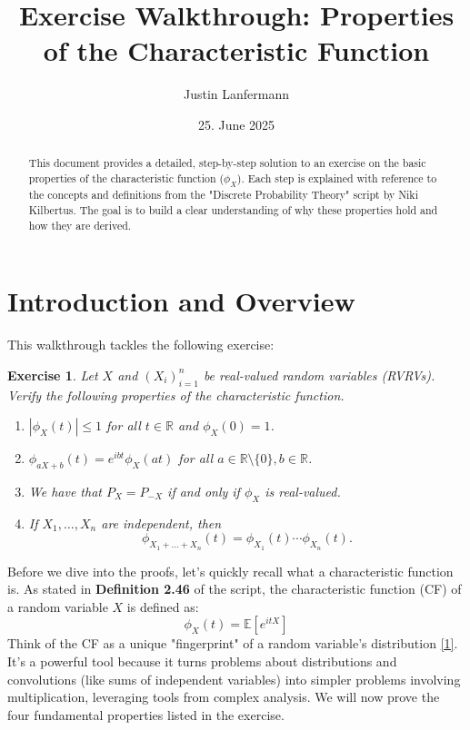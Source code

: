 \documentclass[11pt,a4paper]{article}
\title{Exercise Walkthrough: Properties of the Characteristic Function}
\author{Justin Lanfermann}
\date{25. June 2025}
\newtheorem{exercise}{Exercise}
\begin{document}
\maketitle

\begin{abstract}
    This document provides a detailed, step-by-step solution to an exercise on the basic properties of the characteristic function ($\phi_X$). Each step is explained with reference to the concepts and definitions from the "Discrete Probability Theory" script by Niki Kilbertus. The goal is to build a clear understanding of why these properties hold and how they are derived.
\end{abstract}

\section{Introduction and Overview}

\noindent
This walkthrough tackles the following exercise:

\begin{exercise}
Let $X$ and $(X_i)_{i=1}^n$ be real-valued random variables (RVRVs). Verify the following properties of the characteristic function.
\begin{enumerate}
    \item[(i)] $|\phi_X(t)| \leq 1$ for all $t \in \mathbb{R}$ and $\phi_X(0) = 1$.
    \item[(ii)] $\phi_{aX+b}(t) = e^{ibt}\phi_X(at)$ for all $a \in \mathbb{R} \setminus \{0\}, b \in \mathbb{R}$.
    \item[(iii)] We have that $P_X = P_{-X}$ if and only if $\phi_X$ is real-valued.
    \item[(iv)] If $X_1, \ldots, X_n$ are independent, then
    \[
        \phi_{X_1+\dots+X_n}(t) = \phi_{X_1}(t)\cdots\phi_{X_n}(t).
    \]
\end{enumerate}
\end{exercise}

Before we dive into the proofs, let's quickly recall what a characteristic function is. As stated in \textbf{Definition 2.46} of the script, the characteristic function (CF) of a random variable $X$ is defined as:
\[ \phi_X(t) = \mathbb{E}[e^{itX}] \]
Think of the CF as a unique "fingerprint" of a random variable's distribution \hyperlink{note1}{[1]}. It's a powerful tool because it turns problems about distributions and convolutions (like sums of independent variables) into simpler problems involving multiplication, leveraging tools from complex analysis. We will now prove the four fundamental properties listed in the exercise.
\end{document}
